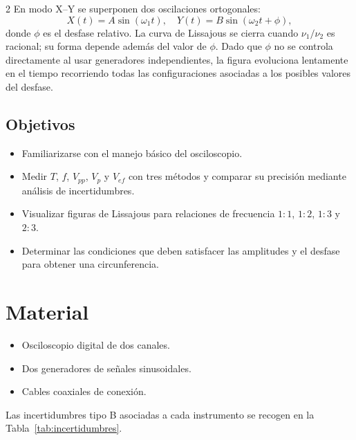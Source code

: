 \documentclass[12pt,a4paper]{article}
\begin{document}
\begin{multicols}{2}
En modo X--Y se superponen dos oscilaciones ortogonales:
\begin{equation}
X(t) = A\sin(\omega_1 t), \quad Y(t) = B\sin(\omega_2 t + \phi),
\label{eq:lissajous}
\end{equation}
donde $\phi$ es el desfase relativo. La curva de Lissajous se cierra cuando $\nu_1/\nu_2$ es racional; su forma depende además del valor de $\phi$. Dado que $\phi$ no se controla directamente al usar generadores independientes, la figura evoluciona lentamente en el tiempo recorriendo todas las configuraciones asociadas a los posibles valores del desfase.

\subsection{Objetivos}

\begin{itemize}
    \item Familiarizarse con el manejo básico del osciloscopio.
    \item Medir $T$, $f$, $V_{pp}$, $V_p$ y $V_{ef}$ con tres métodos y comparar su precisión mediante análisis de incertidumbres.
    \item Visualizar figuras de Lissajous para relaciones de frecuencia $1{:}1$, $1{:}2$, $1{:}3$ y $2{:}3$.
    \item Determinar las condiciones que deben satisfacer las amplitudes y el desfase para obtener una circunferencia.
\end{itemize}

\section{Material}

\begin{itemize}
    \item Osciloscopio digital de dos canales.
    \item Dos generadores de señales sinusoidales.
    \item Cables coaxiales de conexión.
\end{itemize}

Las incertidumbres tipo B asociadas a cada instrumento se recogen en la Tabla~\ref{tab:incertidumbres}.


\end{multicols}
\end{document}
